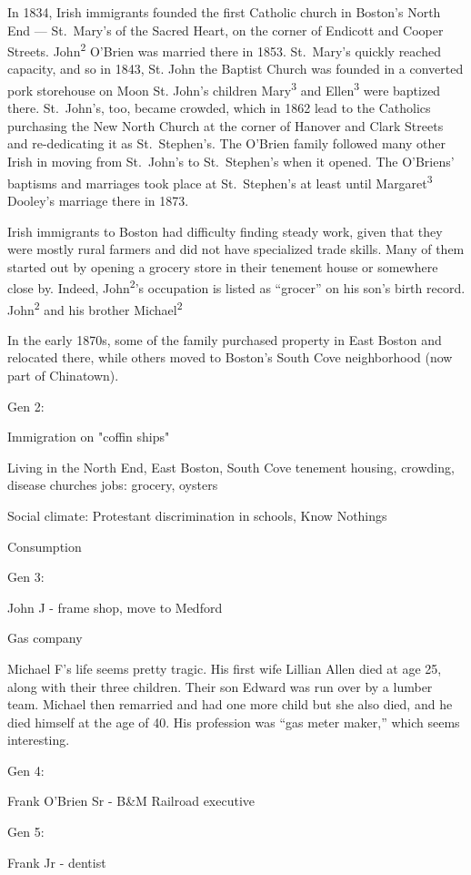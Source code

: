 In 1834, Irish immigrants founded the first Catholic church in Boston's North End --- St.\ Mary's of the Sacred Heart, on the corner of Endicott and Cooper Streets.\cite{Todisco:26} John\textsuperscript{2} O'Brien was married there in 1853.\cite{John2OBrienMarriage} St.\ Mary's quickly reached capacity, and so in 1843, St. John the Baptist Church was founded in a converted pork storehouse on Moon St.\cite{Goldfeld:101,Sullivan:128} John's children Mary\textsuperscript{3} and Ellen\textsuperscript{3} were baptized there. St.\ John's, too, became crowded, which in 1862 lead to the Catholics purchasing the New North Church at the corner of Hanover and Clark Streets and re-dedicating it as St.\ Stephen's.\cite{Sullivan:128} The O'Brien family followed many other Irish in moving from St.\ John's to St.\ Stephen's when it opened. The O'Briens' baptisms and marriages took place at St.\ Stephen's at least until Margaret\textsuperscript{3} Dooley's marriage there in 1873.\cite{RobertFernaldMarriage}

Irish immigrants to Boston had difficulty finding steady work, given that they were mostly rural farmers and did not have specialized trade skills.\cite{Ryan:21} Many of them started out by opening a grocery store in their tenement house or somewhere close by.\cite{Ryan:83} Indeed, John\textsuperscript{2}'s occupation is listed as ``grocer'' on his son's birth record.\cite{John3OBrienBirth} John\textsuperscript{2} and his brother Michael\textsuperscript{2} 




In the early 1870s, some of the family purchased property in East Boston and relocated there, while others moved to Boston's South Cove neighborhood (now part of Chinatown).\cite{1870sAddresses} 





Gen 2:

Immigration on "coffin ships"

Living in the North End, East Boston, South Cove
tenement housing, crowding, disease
churches
jobs: grocery, oysters

Social climate: Protestant discrimination in schools, Know Nothings

Consumption

Gen 3: 

John J - frame shop, move to Medford

Gas company

Michael F’s life seems pretty tragic. His first wife Lillian Allen died at age 25, along with their three children. Their son Edward was run over by a lumber team. Michael then remarried and had one more child but she also died, and he died himself at the age of 40. His profession was “gas meter maker,” which seems interesting.

Gen 4:

Frank O'Brien Sr - B\&M Railroad executive

Gen 5:

Frank Jr - dentist

